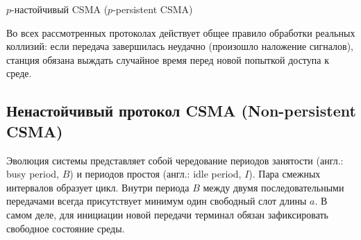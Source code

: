 \begin{definition}{$p$-настойчивый CSMA ($p$-persistent CSMA)}
\begin{center}
    \end{center}
\end{definition}

\begin{note}
    Во всех рассмотренных протоколах действует общее правило обработки реальных коллизий: если передача завершилась неудачно (произошло наложение сигналов), станция обязана выждать случайное время перед новой попыткой доступа к среде.
\end{note}

\subsection{Ненастойчивый протокол CSMA (Non-persistent CSMA)}

Эволюция системы представляет собой чередование периодов занятости (англ.: busy period, $B$) и периодов простоя (англ.: idle period, $I$). Пара смежных интервалов образует цикл. Внутри периода $B$ между двумя последовательными передачами всегда присутствует минимум один свободный слот длины $a$. В самом деле, для инициации новой передачи терминал обязан зафиксировать свободное состояние среды.

